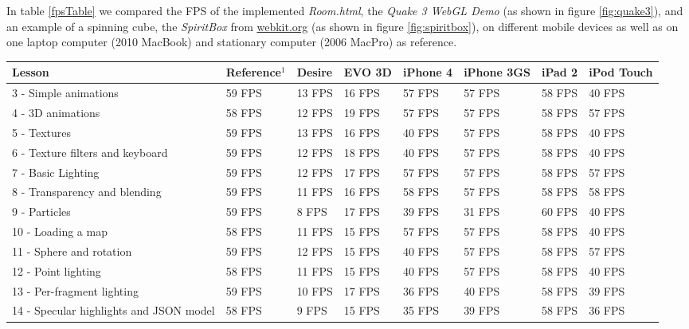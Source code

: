 \documentclass[12pt,journal,compsoc]{IEEEtran}
\begin{document}
In table \ref{fpsTable} we compared the FPS of the implemented \textit{Room.html}, the \textit{Quake 3 WebGL Demo} \cite{quakewebgl} (as shown in figure \ref{fig:quake3}), and an example of a spinning cube, the \textit{SpiritBox} from \url {webkit.org} \cite{SpiritBox} (as shown in figure \ref{fig:spiritbox}), on different mobile devices as well as on one laptop computer (2010 MacBook) and stationary computer (2006 MacPro) as reference. 

\begin{table}[tb]
	\begin{centering}
	\begin{tabular}{l|l|l|l|l|l|l|l}
		\textbf{Lesson}								& \textbf{Reference$^{1}$}& \textbf{Desire}		& \textbf{EVO 3D}		& \textbf{iPhone 4}		& \textbf{iPhone 3GS}	& \textbf{iPad 2}	& \textbf{iPod Touch}\\
		\hline
		3 - Simple animations						& 59 FPS		& 13 FPS		& 16 FPS		& 57 FPS		& 57 FPS		& 58 FPS	& 40 FPS				\\
		4 - 3D animations							& 58 FPS		& 12 FPS		& 19 FPS		& 57 FPS		& 57 FPS		& 58 FPS	& 57 FPS				\\
		5 - Textures								& 59 FPS		& 13 FPS		& 16 FPS		& 40 FPS		& 57 FPS		& 58 FPS	& 40 FPS				\\
		6 - Texture filters and keyboard			& 59 FPS		& 12 FPS		& 18 FPS		& 40 FPS		& 57 FPS		& 58 FPS	& 40 FPS				\\
		7 - Basic Lighting							& 59 FPS		& 12 FPS		& 17 FPS		& 57 FPS		& 57 FPS		& 58 FPS	& 57 FPS				\\
		8 - Transparency and blending				& 59 FPS		& 11 FPS		& 16 FPS		& 58 FPS		& 57 FPS		& 58 FPS	& 58 FPS				\\
		9 - Particles								& 59 FPS		&  8 FPS		& 17 FPS		& 39 FPS		& 31 FPS		& 60 FPS	& 40 FPS				\\
		10 - Loading a map							& 58 FPS		& 11 FPS		& 15 FPS		& 57 FPS		& 57 FPS		& 58 FPS	& 40 FPS				\\
		11 - Sphere and rotation					& 59 FPS		& 12 FPS		& 15 FPS		& 40 FPS		& 57 FPS		& 58 FPS	& 57 FPS				\\
		12 - Point lighting							& 58 FPS		& 11 FPS		& 15 FPS		& 40 FPS		& 57 FPS		& 58 FPS	& 40 FPS				\\
		13 - Per-fragment lighting					& 59 FPS		& 10 FPS		& 17 FPS		& 36 FPS		& 40 FPS		& 58 FPS	& 39 FPS				\\
		14 - Specular highlights and JSON model		& 58 FPS		&  9 FPS		& 15 FPS		& 35 FPS		& 39 FPS		& 58 FPS	& 36 FPS				\\

\end{tabular}
\end{centering}
\end{table}
\end{document}
